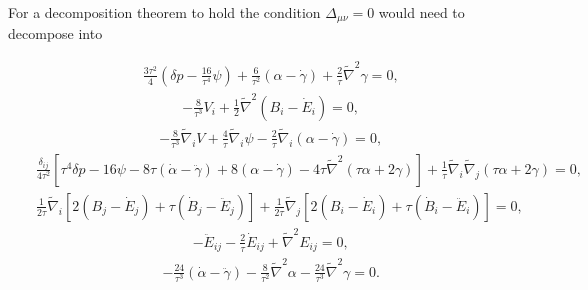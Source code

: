\documentclass[aps,onecolumn,10pt]{revtex4}
\numberwithin{equation}{section}
\numberwithin{equation}{section}
\begin{document}
For a decomposition theorem to hold the condition $\Delta_{\mu\nu}=0$ would need to decompose into 

%
\begin{eqnarray}
 &&\frac{3\tau^2}{4}\left(\delta p -\frac{16}{\tau^4}\psi\right)
 +\frac{6}{\tau^2}(\alpha-\dot{\gamma})+\frac{2}{\tau}\tilde{\nabla}^2\gamma=0,
 \label{8.40}
\end{eqnarray}
%
\begin{eqnarray}
&&-\frac{8}{\tau^3}V_{i}+\frac{1}{2}\tilde{\nabla}^2(B_i-\dot{E}_i)=0,
 \label{8.41}
\end{eqnarray}
%
%
\begin{eqnarray}
&&-\frac{8}{\tau^3}\tilde{\nabla}_iV+\frac{4}{\tau}\tilde{\nabla}_i\psi
 -\frac{2}{\tau}\tilde{\nabla}_i(\alpha-\dot{\gamma})=0,
 \label{8.42}
\end{eqnarray}
%
\begin{eqnarray}
&&\frac{\delta_{ij}}{4\tau^2}\left[\tau^4\delta p-16\psi-8\tau(\dot{\alpha}-\ddot{\gamma})+8(\alpha-\dot{\gamma})-4\tau \tilde{\nabla}^2(\tau\alpha+2\gamma)\right]
+\frac{1}{\tau}\tilde{\nabla}_i\tilde{\nabla}_j(\tau\alpha+2\gamma)=0,
 \label{8.43}
\end{eqnarray}
%
\begin{eqnarray}
&&\frac{1}{2\tau}\tilde{\nabla}_i[2(B_j-\dot{E}_j)+\tau(\dot{B}_j-\ddot{E}_j)]
+\frac{1}{2\tau}\tilde{\nabla}_j[2(B_i-\dot{E}_i)+\tau(\dot{B}_i-\ddot{E}_i)]=0,
 \label{8.44}
\end{eqnarray}
%
\begin{eqnarray}
&&-\ddot{E}_{ij}-\frac{2}{\tau}\dot{E}_{ij}+\tilde{\nabla}^2E_{ij}=0,
 \label{8.45}
\end{eqnarray}
%
\begin{eqnarray}
&& -\frac{24}{\tau^3}(\dot{\alpha}-\ddot{\gamma})-\frac{8}{\tau^2}\tilde{\nabla}^2\alpha-\frac{24}{\tau^3}\tilde{\nabla}^2\gamma=0.
\label{8.46}
\end{eqnarray}
%
\end{document}
